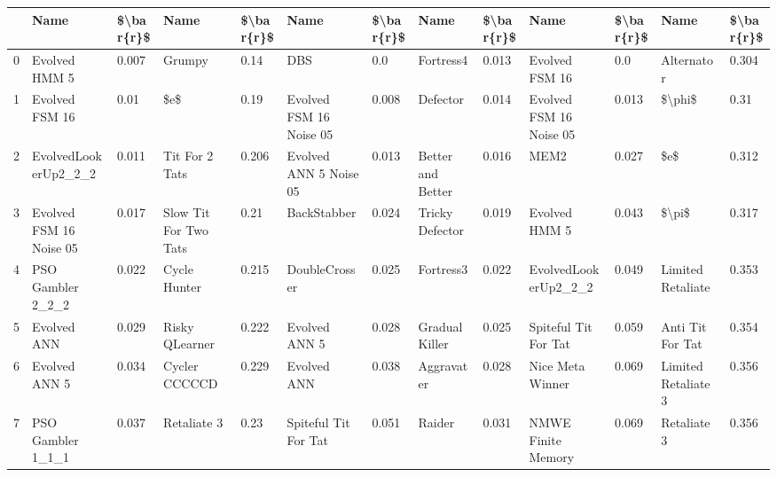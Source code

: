 \begin{tabular}{lllllllllllll}
\toprule
{} &                     Name & \$\textbackslash bar\{r\}\$ &                   Name & \$\textbackslash bar\{r\}\$ &                        Name & \$\textbackslash bar\{r\}\$ &               Name & \$\textbackslash bar\{r\}\$ &                       Name & \$\textbackslash bar\{r\}\$ &                 Name & \$\textbackslash bar\{r\}\$ \\
\midrule
0  &            Evolved HMM 5 &     0.007 &                 Grumpy &      0.14 &                         DBS &       0.0 &          Fortress4 &     0.013 &             Evolved FSM 16 &       0.0 &           Alternator &     0.304 \\
1  &           Evolved FSM 16 &      0.01 &                    \$e\$ &      0.19 &     Evolved FSM 16 Noise 05 &     0.008 &           Defector &     0.014 &    Evolved FSM 16 Noise 05 &     0.013 &               \$\textbackslash phi\$ &      0.31 \\
2  &     EvolvedLookerUp2\_2\_2 &     0.011 &         Tit For 2 Tats &     0.206 &      Evolved ANN 5 Noise 05 &     0.013 &  Better and Better &     0.016 &                       MEM2 &     0.027 &                  \$e\$ &     0.312 \\
3  &  Evolved FSM 16 Noise 05 &     0.017 &  Slow Tit For Two Tats &      0.21 &                 BackStabber &     0.024 &    Tricky Defector &     0.019 &              Evolved HMM 5 &     0.043 &                \$\textbackslash pi\$ &     0.317 \\
4  &        PSO Gambler 2\_2\_2 &     0.022 &           Cycle Hunter &     0.215 &               DoubleCrosser &     0.025 &          Fortress3 &     0.022 &       EvolvedLookerUp2\_2\_2 &     0.049 &    Limited Retaliate &     0.353 \\
5  &              Evolved ANN &     0.029 &         Risky QLearner &     0.222 &               Evolved ANN 5 &     0.028 &     Gradual Killer &     0.025 &       Spiteful Tit For Tat &     0.059 &     Anti Tit For Tat &     0.354 \\
6  &            Evolved ANN 5 &     0.034 &          Cycler CCCCCD &     0.229 &                 Evolved ANN &     0.038 &         Aggravater &     0.028 &           Nice Meta Winner &     0.069 &  Limited Retaliate 3 &     0.356 \\
7  &        PSO Gambler 1\_1\_1 &     0.037 &            Retaliate 3 &      0.23 &        Spiteful Tit For Tat &     0.051 &             Raider &     0.031 &         NMWE Finite Memory &     0.069 &          Retaliate 3 &     0.356 \\

\end{tabular}
